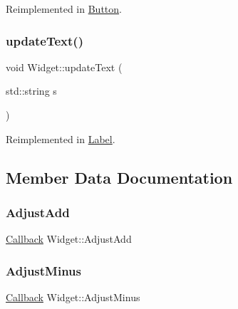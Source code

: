 Reimplemented in \mbox{\hyperlink{class_button_a5e814220d9d44922eedded14d5511493}{Button}}.

\mbox{\label{class_widget_ad8d574eab88c94919dc01a33703066b3}} 
\subsubsection{\texorpdfstring{updateText()}{updateText()}}
{\footnotesize\ttfamily void Widget\+::update\+Text (\begin{DoxyParamCaption}\item[{std\+::string}]{s }\end{DoxyParamCaption})\hspace{0.3cm}{\ttfamily [virtual]}}



Reimplemented in \mbox{\hyperlink{class_label_a2a06e54df5c7e7aa3c7c7749fa80817c}{Label}}.



\subsection{Member Data Documentation}
\mbox{\label{class_widget_a64087ac2bd8c3c298015688d0b4fc9e1}} 
\subsubsection{\texorpdfstring{AdjustAdd}{AdjustAdd}}
{\footnotesize\ttfamily \mbox{\hyperlink{class_widget_af75970041184b1a72bceff618e142a09}{Callback}} Widget\+::\+Adjust\+Add}

\mbox{\label{class_widget_ad542bffdf09356c763dcc0ab8cd7916c}} 
\subsubsection{\texorpdfstring{AdjustMinus}{AdjustMinus}}
{\footnotesize\ttfamily \mbox{\hyperlink{class_widget_af75970041184b1a72bceff618e142a09}{Callback}} Widget\+::\+Adjust\+Minus}

\mbox{\label{class_widget_a7deb9286ee1faafbe8e988877d4d3ab3}} 
